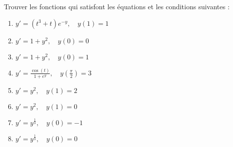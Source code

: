 
\begin{exercice}\label{exoTD6b-0003}

Trouver les fonctions qui satisfont les équations et les conditions suivantes : 
\begin{multicols}{2}
\begin{enumerate}
\item $ y' = (t^3 + t) e^{-y}, \quad y(1)=1$
\item $ y' = 1 + y^2, \quad y(0) = 0$
\item $ y' = 1 + y^2, \quad y(0) = 1$
\item $ y' = \frac{\cos(t)}{1 + e^y}, \quad y(\frac{\pi}{2})=3 $
\item $ y' = y^2, \quad y(1) = 2$
\item $ y' = y^2, \quad y(1) = 0$
\item $ y' = y^{\frac{1}{3}}, \quad y(0) = -1 $
\item $ y' = y^{\frac{1}{3}},\quad y(0) = 0 $
\end{enumerate}	
\end{multicols}


\end{exercice}
